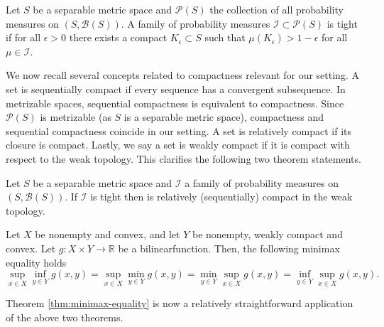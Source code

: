 \documentclass[11pt,a4paper]{article}
\numberwithin{equation}{section}
\begin{document}
\begin{definition}
    Let $S$ be a separable metric space and $\mathcal{P}(S)$ the collection of all probability measures on $(S,\mathcal{B}(S))$. A family of probability measures $\mathcal{I}\subset\mathcal{P}(S)$ is tight if for all $\epsilon>0$ there exists a compact $K_\epsilon\subset S$ such that $\mu(K_\epsilon)>1-\epsilon$ for all $\mu\in\mathcal{I}$.
\end{definition}

We now recall several concepts related to compactness relevant for our setting.
A set is sequentially compact if every sequence has a convergent subsequence. In metrizable spaces, sequential compactness is equivalent to compactness. 
Since $\mathcal{P}(S)$ is metrizable (as $S$ is a separable metric space), compactness and sequential compactness coincide in our setting.
A set is relatively compact if its closure is compact. Lastly, we say a set is weakly compact if it is compact with respect to the weak topology. This clarifies the following two theorem statements.
\begin{lemma}
    \label{thm:prokhorov}
    Let $S$ be a separable metric space and $\mathcal{I}$ a family of probability measures on $(S,\mathcal{B}(S))$. If $\mathcal{I}$ is tight then is relatively (sequentially) compact in the weak topology.
\end{lemma}

\begin{lemma}
    \label{thm:VonNeumannFan}
    Let $X$ be nonempty and convex, and let $Y$ be nonempty, weakly compact and convex. Let $g:X\times Y\to \mathbb{R}$ 
    be a bilinear\footnotemark function. Then, the following minimax equality holds
    $$
    \sup_{x\in X}\inf_{y\in Y}g(x,y)=\sup_{x\in X}\min_{y\in Y}g(x,y)=\min_{y\in Y}\sup_{x\in X}g(x,y)=\inf_{y\in Y}\sup_{x\in X}g(x,y).
    $$
\end{lemma}
Theorem \ref{thm:minimax-equality} is now a relatively straightforward application of the above two theorems.
\end{document}
